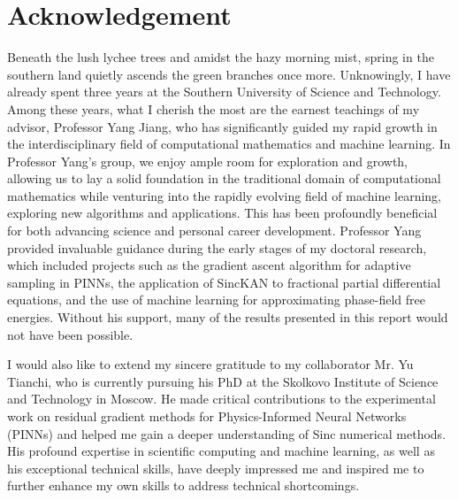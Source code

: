 \section{Acknowledgement}
Beneath the lush lychee trees and amidst the hazy morning mist, spring in the southern land quietly ascends the green branches once more. Unknowingly, I have already spent three years at the Southern University of Science and Technology. Among these years, what I cherish the most are the earnest teachings of my advisor, Professor Yang Jiang, who has significantly guided my rapid growth in the interdisciplinary field of computational mathematics and machine learning. In Professor Yang’s group, we enjoy ample room for exploration and growth, allowing us to lay a solid foundation in the traditional domain of computational mathematics while venturing into the rapidly evolving field of machine learning, exploring new algorithms and applications. This has been profoundly beneficial for both advancing science and personal career development. Professor Yang provided invaluable guidance during the early stages of my doctoral research, which included projects such as the gradient ascent algorithm for adaptive sampling in PINNs, the application of SincKAN to fractional partial differential equations, and the use of machine learning for approximating phase-field free energies. Without his support, many of the results presented in this report would not have been possible.  

I would also like to extend my sincere gratitude to my collaborator Mr. Yu Tianchi, who is currently pursuing his PhD at the Skolkovo Institute of Science and Technology in Moscow. He made critical contributions to the experimental work on residual gradient methods for Physics-Informed Neural Networks (PINNs) and helped me gain a deeper understanding of Sinc numerical methods. His profound expertise in scientific computing and machine learning, as well as his exceptional technical skills, have deeply impressed me and inspired me to further enhance my own skills to address technical shortcomings.








